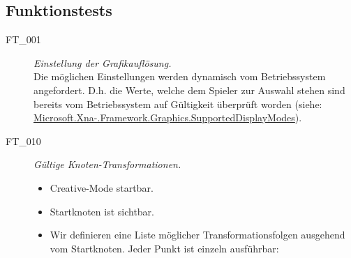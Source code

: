 %



\subsection{Funktionstests}
\label{Abschnitt:Tests:Protokoll:Funktion}


\begin{description}

	\item[FT\_001] \textit{Einstellung der Grafikauflösung.} \hfill\\
	
	Die möglichen Einstellungen werden dynamisch vom Betriebssystem angefordert. D.h. die Werte, welche dem Spieler zur Auswahl stehen sind bereits vom Betriebssystem auf Gültigkeit überprüft worden (siehe:  \href{http://msdn.microsoft.com/de-de/library/microsoft.xna.framework.graphics.graphicsadapter.supporteddisplaymodes}{Microsoft.Xna-.Framework.Graphics.SupportedDisplayModes}).\\
	
	\item[FT\_010] \textit{Gültige Knoten-Transformationen.} \hfill\\
	
	\begin{itemize}
	
		\item Creative-Mode startbar.
		\item Startknoten ist sichtbar.
	
		\item Wir definieren eine Liste möglicher Transformationsfolgen ausgehend vom Startknoten. Jeder Punkt ist einzeln ausführbar: \hfill\\

		\begin{enumerate}
	

\end{enumerate}
\end{itemize}
\end{description}
